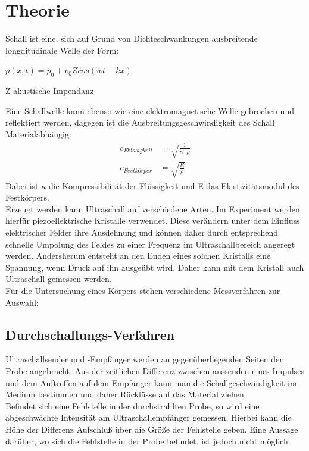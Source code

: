 

\section{Theorie}
Schall ist eine, sich auf Grund von Dichteschwankungen ausbreitende longditudinale Welle der Form:
\begin{formel}[H]
\center
	$p(x,t) = p_0 + v_0Zcos(wt-kx)$
	\caption*{\small{Z-akustische Impendanz}}
\end{formel}
Eine Schallwelle kann ebenso wie eine elektromagnetische Welle gebrochen und reflektiert werden, dagegen ist die Ausbreitungsgeschwindigkeit des Schall Materialabhängig:
\begin{align}
	c_{Flüssigkeit}&= \sqrt{\frac{1}{\kappa \cdot \rho}}\\
	c_{Festkörper}&= \sqrt{\frac{E}{\rho}}
\end{align}
Dabei ist $\kappa$ die Kompressibilität der Flüssigkeit und E das Elastizitätsmodul des Festkörpers.\\

Erzeugt werden kann Ultraschall auf verschiedene Arten. Im Experiment werden hierfür piezoellektrische Kristalle verwendet. Diese verändern unter dem Einfluss elektrischer Felder ihre Ausdehnung und können daher durch entsprechend schnelle Umpolung des Feldes zu einer Frequenz im Ultraschallbereich angeregt werden. Andersherum entsteht an den Enden eines solchen Kristalls eine Spannung, wenn Druck auf ihn ausgeübt wird. Daher kann mit dem Kristall auch Ultraschall gemessen werden.\\
Für die Untersuchung eines Körpers stehen verschiedene Messverfahren zur Auswahl:

\subsection{Durchschallungs-Verfahren}
Ultraschallsender und -Empfänger werden an gegenüberliegenden Seiten der Probe angebracht. Aus der zeitlichen Differenz zwischen aussenden eines Impulses und dem Auftreffen auf dem Empfänger kann man die Schallgeschwindigkeit im Medium bestimmen und daher Rücklüsse auf das Material ziehen.\\
Befindet sich eine Fehlstelle in der durchstrahlten Probe, so wird eine abgeschwächte Intensität am Ultraschallempfänger gemessen. Hierbei kann die Höhe der Differenz Aufschluß über die Größe der Fehlstelle geben. Eine
Aussage darüber, wo sich die Fehlstelle in der Probe befindet, ist jedoch nicht möglich.\\

